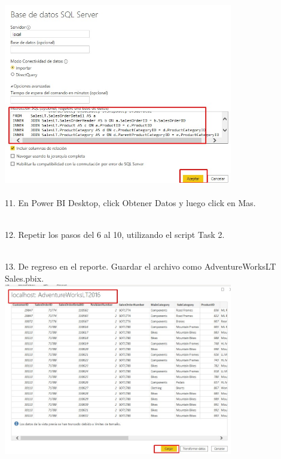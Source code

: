 \documentclass[preprint,12pt]{elsarticle}
\begin{document}
\begin{itemize}
		 		\\ \includegraphics[width=10cm]{./IMAGENES/1.1.10} \\
		 		\\ 11. En Power BI Desktop, click Obtener Datos y luego click en Mas.
		 	
		 		\\ 12. Repetir los pasos del 6 al 10, utilizando el script Task 2.
		 		
		 		\\ 13. De regreso en el reporte. Guardar el archivo como AdventureWorksLT Sales.pbix.
		 	\\ \includegraphics[width=10cm]{./IMAGENES/1.1.11} \\
		 	

\end{itemize}
\end{document}
